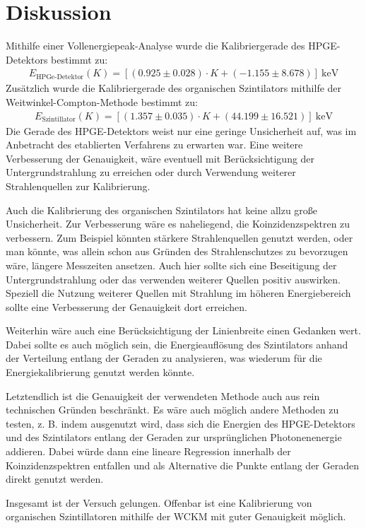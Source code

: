 \section{Diskussion}

Mithilfe einer Vollenergiepeak-Analyse wurde die Kalibriergerade des HPGE-Detektors bestimmt zu:
\begin{gather}
    E_{\text{HPGe-Detektor}} (K) = [(0.925 \pm 0.028) \cdot K + (-1.155 \pm 8.678)] \ \si{\kilo\electronvolt}
\end{gather}
Zusätzlich wurde die Kalibriergerade des organischen Szintilators mithilfe der Weitwinkel-Compton-Methode bestimmt zu:
\begin{gather}
    E_{\text{Szintillator}} (K) = [(1.357 \pm 0.035) \cdot K + (44.199 \pm 16.521)] \ \si{\kilo\electronvolt}
\end{gather}
Die Gerade des HPGE-Detektors weist nur eine geringe Unsicherheit auf, was im Anbetracht des etablierten Verfahrens zu erwarten war.
Eine weitere Verbesserung der Genauigkeit, wäre eventuell mit Berücksichtigung der Untergrundstrahlung zu erreichen oder durch Verwendung weiterer Strahlenquellen zur Kalibrierung.

Auch die Kalibrierung des organischen Szintilators hat keine allzu große Unsicherheit.
Zur Verbesserung wäre es naheliegend, die Koinzidenzspektren zu verbessern.
Zum Beispiel könnten stärkere Strahlenquellen genutzt werden, oder man könnte, was allein schon aus Gründen des Strahlenschutzes zu bevorzugen wäre, längere Messzeiten ansetzen.
Auch hier sollte sich eine Beseitigung der Untergrundstrahlung oder das verwenden weiterer Quellen positiv auswirken.
Speziell die Nutzung weiterer Quellen mit Strahlung im höheren Energiebereich sollte eine Verbesserung der Genauigkeit dort erreichen.

Weiterhin wäre auch eine Berücksichtigung der Linienbreite einen Gedanken wert.
Dabei sollte es auch möglich sein, die Energieauflösung des Szintilators anhand der Verteilung entlang der Geraden zu analysieren, was wiederum für die Energiekalibrierung genutzt werden könnte.

Letztendlich ist die Genauigkeit der verwendeten Methode auch aus rein technischen Gründen beschränkt.
Es wäre auch möglich andere Methoden zu testen, z. B. indem ausgenutzt wird, dass sich die Energien des HPGE-Detektors und des Szintilators entlang der Geraden zur ursprünglichen Photonenenergie addieren.
Dabei würde dann eine lineare Regression innerhalb der Koinzidenzspektren entfallen und als Alternative die Punkte entlang der Geraden direkt genutzt werden.

Insgesamt ist der Versuch gelungen.
Offenbar ist eine Kalibrierung von organischen Szintillatoren mithilfe der WCKM mit guter Genauigkeit möglich.
